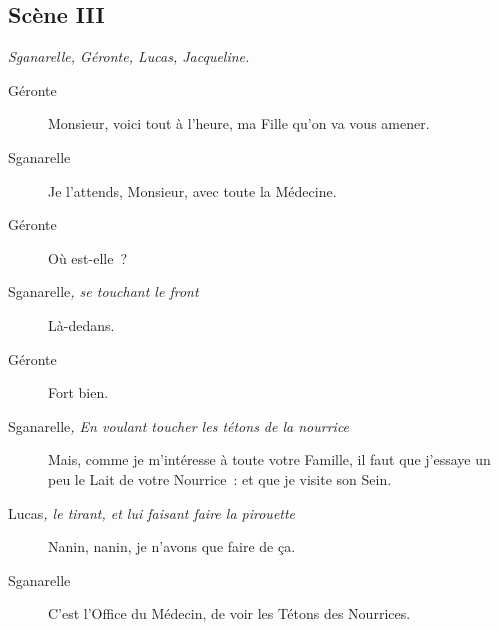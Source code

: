 \documentclass[french,twoside]{book} %
\begin{document}
\subsection[{Scène III}]{Scène III}
\label{II03}
\textit{Sganarelle, Géronte, Lucas, Jacqueline.}\par
 \begin{description} \item[Géronte] 

Monsieur, voici tout à l’heure, ma Fille qu’on va vous amener.\end{description}
 \begin{description} \item[Sganarelle] 

Je l’attends, Monsieur, avec toute la Médecine.\end{description}
 \begin{description} \item[Géronte] 

Où est-elle ?\end{description}
 \begin{description} \item[Sganarelle\textit{, se touchant le front}\par
] 

Là-dedans.\end{description}
 \begin{description} \item[Géronte] 

Fort bien.\end{description}
 \begin{description} \item[Sganarelle\textit{, En voulant toucher les tétons de la nourrice}\par
] 

Mais, comme je m’intéresse à toute votre Famille, il faut que j’essaye un peu le Lait de votre Nourrice : et que je visite son Sein.\end{description}
 \begin{description} \item[Lucas\textit{, le tirant, et lui faisant faire la pirouette}\par
] 

Nanin, nanin, je n’avons que faire de ça.\end{description}
 \begin{description} \item[Sganarelle] 

C’est l’Office du Médecin, de voir les Tétons des Nourrices.\end{description}
\end{document}
